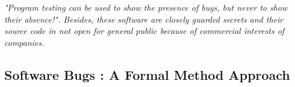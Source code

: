    \textit{ "Program testing can be used to show the presence of bugs, 
    but never to show their absence!". Besides, these software 
    are closely guarded secrets and their source 
   code in not open for general public because of commercial 
   interests of companies.}
   
%   
%   
%   
%   
%   
%   
%   
%  
%   
   
   
   \subsection{Software Bugs : A Formal Method Approach}

	

